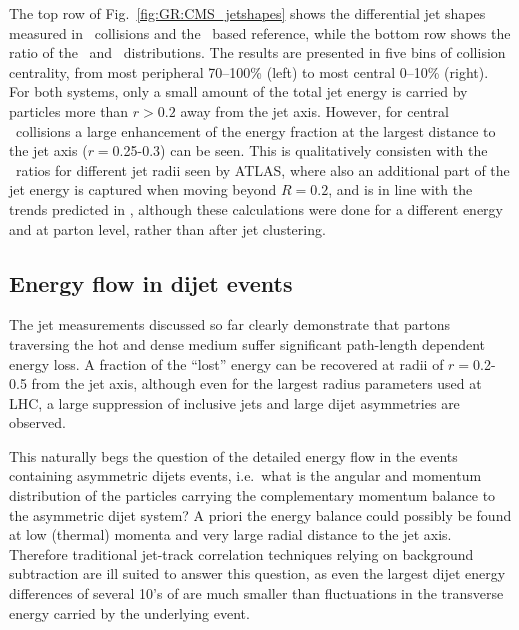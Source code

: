 The top row of Fig.~\ref{fig:GR:CMS_jetshapes} shows the differential jet shapes measured in \PbPb\ 
collisions and the \pp\ based reference, while the bottom row shows the ratio of the \PbPb\ and \pp\ 
distributions. The results are presented in five bins of collision centrality, from
most peripheral 70--100\% (left) to most central 0--10\% (right). For 
both systems, only a small amount of the total jet energy 
is carried by particles more than  $r> 0.2$ away from the jet axis. However, for central 
\PbPb\ collisions a large enhancement of the energy fraction at the largest distance
to the jet axis ($r = $0.25-0.3) can be seen.
This is qualitatively consisten with the \Rcp\ ratios for different jet radii seen by ATLAS, 
where also an additional part of the jet energy is captured when moving beyond $R = 0.2$, and is 
in line with the trends predicted in \cite{Vitev:2008rz,Renk:2009hv}, although these calculations were
done for a different energy and at parton level, rather than after jet clustering.

\subsection{Energy flow in dijet events}

The jet measurements discussed so far clearly demonstrate that partons traversing the hot and dense 
medium suffer significant path-length dependent energy loss. A fraction of the ``lost'' energy
can be recovered at radii of $r=$0.2-0.5 from the jet axis, although even for the largest radius
parameters used at LHC, a large suppression of inclusive jets and large dijet asymmetries are
observed. 

This naturally begs the question of the detailed energy flow in the events containing asymmetric
dijets events, i.e.\ what is the angular and momentum distribution of the particles carrying 
the complementary momentum balance to the asymmetric dijet system? A priori the energy balance
could possibly be found at low (thermal) momenta and very large radial distance to the jet axis.
Therefore traditional jet-track correlation techniques relying on background subtraction are ill suited
to answer this question, as even the largest dijet energy differences of several 10's of \GeV
are much smaller than fluctuations in the transverse energy carried by the underlying event.

